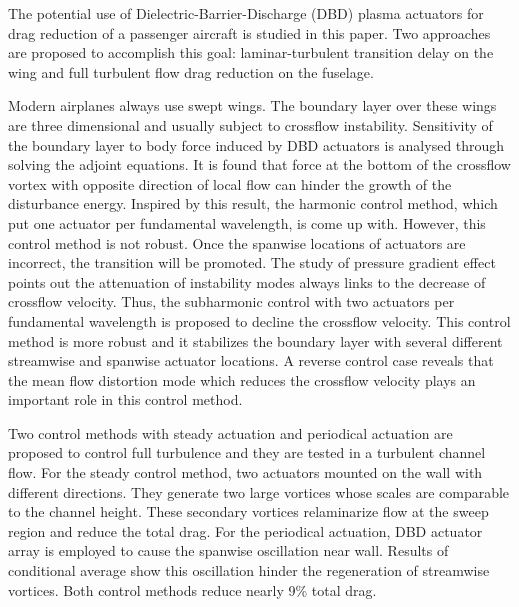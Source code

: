 \begin{eabstract}
   The potential use of Dielectric-Barrier-Discharge (DBD) plasma actuators for drag reduction of a passenger aircraft is studied in this paper. Two approaches are proposed to accomplish this goal: laminar-turbulent transition delay on the wing and full turbulent flow drag reduction on the fuselage.
   
   Modern airplanes always use swept wings. The boundary layer over these wings are three dimensional and usually subject to crossflow instability. Sensitivity of the boundary layer to body force induced by DBD actuators is analysed through solving the adjoint equations. It is found that force at the bottom of the crossflow vortex with opposite direction of local flow can hinder the growth of the disturbance energy. Inspired by this result, the harmonic control method, which put one actuator per fundamental wavelength, is come up with. However, this control method is not robust. Once the spanwise locations of actuators are incorrect, the transition will be promoted. The study of pressure gradient effect points out the attenuation of instability modes always links to the decrease of crossflow velocity. Thus, the subharmonic control with two actuators per fundamental wavelength is proposed to decline the crossflow velocity. This control method is more robust and it stabilizes the boundary layer with several different streamwise and spanwise actuator locations. A reverse control case reveals that the mean flow distortion mode which reduces the crossflow velocity plays an important role in this control method.
   
   Two control methods with steady actuation and periodical actuation are proposed to control full turbulence and they are tested in a turbulent channel flow. For the steady control method, two actuators mounted on the wall with different directions. They generate two large vortices whose scales are comparable to the channel height. These secondary vortices relaminarize flow at the sweep region and reduce the total drag. For the periodical actuation, DBD actuator array is employed to cause the spanwise oscillation near wall. Results of conditional average show this oscillation hinder the regeneration of streamwise vortices. Both control methods reduce nearly 9\% total drag.
\end{eabstract}

